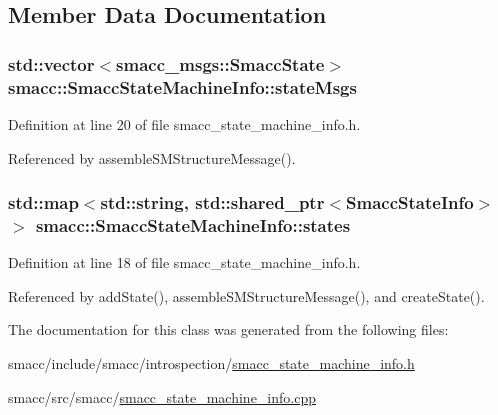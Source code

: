 \subsection{Member Data Documentation}
\subsubsection[{\texorpdfstring{state\+Msgs}{stateMsgs}}]{\setlength{\rightskip}{0pt plus 5cm}std\+::vector$<$smacc\+\_\+msgs\+::\+Smacc\+State$>$ smacc\+::\+Smacc\+State\+Machine\+Info\+::state\+Msgs}\hypertarget{classsmacc_1_1SmaccStateMachineInfo_aac401ecee7b25676a316e3dbdc680af8}{}\label{classsmacc_1_1SmaccStateMachineInfo_aac401ecee7b25676a316e3dbdc680af8}


Definition at line 20 of file smacc\+\_\+state\+\_\+machine\+\_\+info.\+h.



Referenced by assemble\+S\+M\+Structure\+Message().

\subsubsection[{\texorpdfstring{states}{states}}]{\setlength{\rightskip}{0pt plus 5cm}std\+::map$<$std\+::string, std\+::shared\+\_\+ptr$<${\bf Smacc\+State\+Info}$>$ $>$ smacc\+::\+Smacc\+State\+Machine\+Info\+::states}\hypertarget{classsmacc_1_1SmaccStateMachineInfo_a8d6f1a9ce60f39835e7aa2179139977f}{}\label{classsmacc_1_1SmaccStateMachineInfo_a8d6f1a9ce60f39835e7aa2179139977f}


Definition at line 18 of file smacc\+\_\+state\+\_\+machine\+\_\+info.\+h.



Referenced by add\+State(), assemble\+S\+M\+Structure\+Message(), and create\+State().



The documentation for this class was generated from the following files\+:\begin{DoxyCompactItemize}
\item 
smacc/include/smacc/introspection/\hyperlink{smacc__state__machine__info_8h}{smacc\+\_\+state\+\_\+machine\+\_\+info.\+h}\item 
smacc/src/smacc/\hyperlink{smacc__state__machine__info_8cpp}{smacc\+\_\+state\+\_\+machine\+\_\+info.\+cpp}\end{DoxyCompactItemize}
